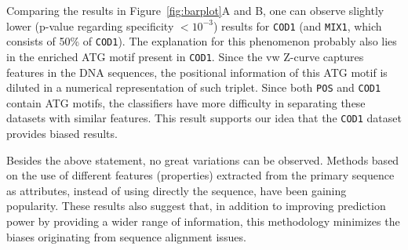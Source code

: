 \documentclass[conference]{IEEEtran}
\begin{document}
Comparing the results in Figure~\ref{fig:barplot}A and B, one can observe slightly lower (p-value regarding specificity $< 10^{-3} $) results for {\tt COD1} (and {\tt MIX1}, which consists of 50\% of {\tt COD1}). The explanation for this phenomenon probably also lies in the enriched ATG motif present in {\tt COD1}. Since the vw Z-curve captures features in the DNA sequences, the positional information of this ATG motif is diluted in a numerical representation of such triplet. Since both {\tt POS} and {\tt COD1} contain ATG motifs, the classifiers have more difficulty in separating these datasets with similar features. This result supports our idea that the {\tt COD1} dataset provides biased results.

Besides the above statement, no great variations can be observed. Methods based on the use of different features (properties) extracted from the primary sequence as attributes, instead of using directly the sequence, have been gaining popularity. These results also suggest that, in addition to improving prediction power by providing a wider range of information, this methodology minimizes the  biases originating from sequence alignment issues. \\
\end{document}
